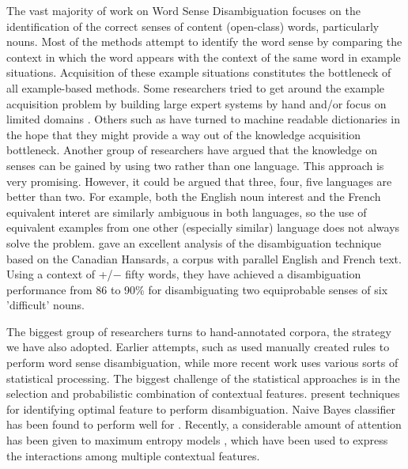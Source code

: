 The vast majority of work on Word Sense Disambiguation focuses on the identification of the correct senses of content (open-class) words, particularly nouns. Most of the methods attempt to identify the word sense by comparing the context in which the word appears with the context of the same word in example situations. Acquisition of these example situations constitutes the bottleneck of all example-based methods. Some researchers tried to get around the example acquisition problem by building large expert systems by hand \cite{Hirst87}\cite{SR83} and/or focus on limited domains \cite{Isa94}\cite{Hirsch86}. Others such as \cite{Lesk96}\cite{Luk93} have turned to machine readable dictionaries in the hope that they might provide a way out of the knowledge acquisition bottleneck. Another group of researchers \cite{Dagan91} have argued that the knowledge on senses can be gained by using two rather than one language. This approach is very promising. However, it could be argued that three, four, five languages are better than two. For example, both the English noun interest and the French equivalent interet are similarly ambiguous in both languages, so the use of equivalent examples from one other (especially similar) language does not always solve the problem. \cite{Gale93} gave an excellent analysis of the disambiguation technique based on the Canadian Hansards, a corpus with parallel English and French text. Using a context of +/$-$ fifty words, they have achieved a disambiguation performance from 86 to 90\% for disambiguating two equiprobable senses of six 'difficult' nouns. 

The biggest group of researchers turns to hand-annotated corpora, the strategy we have also adopted. Earlier attempts, such as \cite{KS75}\cite{Weiss73}\cite{Black87}\cite{Black88} used manually created rules to perform word sense disambiguation, while more recent work uses various sorts of statistical processing. The biggest challenge of the statistical approaches is in the selection and probabilistic combination of contextual features. \cite{Brown91}\cite{Dagan91}\cite{Yarowsky93} present techniques for identifying optimal feature to perform disambiguation. Naive Bayes classifier has been found to perform well for \cite{Bruce94}\cite{Leacock93}\cite{Mooney96}. Recently, a considerable amount of attention has been given to maximum entropy models \cite{Berger96}, which have been used to express the interactions among multiple contextual features.

